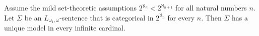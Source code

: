 Assume the mild set-theoretic assumptions $2^{\aleph_n} < 2^{\aleph_{n+1}}$ for all natural numbers $n$. Let $\Sigma$ be an $L_{\omega_1,\omega}$-sentence that is categorical in $2^{\aleph_n}$ for every $n$. Then $\Sigma$ has a unique model in every infinite cardinal.
